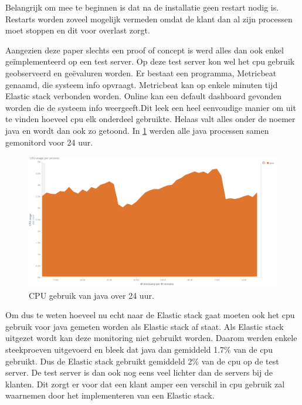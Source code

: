 Belangrijk om mee te beginnen is dat na de installatie geen restart nodig is. Restarts worden zoveel mogelijk vermeden omdat de klant dan al zijn processen moet stoppen en dit voor overlast zorgt.

Aangezien deze paper slechts een proof of concept is werd alles dan ook enkel geïmplementeerd op een test server. Op deze test server kon wel het cpu gebruik geobserveerd en geëvaluren worden. 
Er bestaat een programma, Metricbeat genaamd, die systeem info opvraagt. Metricbeat kan op enkele minuten tijd Elastic stack verbonden worden. Online kan een default dashboard gevonden worden die de systeem info weergeeft.Dit leek een heel eenvoudige manier om uit te vinden hoeveel cpu elk onderdeel gebruikte. Helaas valt alles onder de noemer java en wordt dan ook zo getoond.
In \ref{fig:java} werden alle java processen samen gemonitord voor 24 uur. 

\begin{figure}[h]
	\includegraphics[width=16cm]{img/java1}
	\caption{CPU gebruik van java over 24 uur.}
	\label{fig:java}
\end{figure}

Om dus te weten hoeveel nu echt naar de Elastic stack gaat moeten ook het cpu gebruik voor java gemeten worden als Elastic stack af staat.
Als Elastic stack uitgezet wordt kan deze monitoring niet gebruikt worden. 
Daarom werden enkele steekproeven uitgevoerd en bleek dat java dan gemiddeld 1.7\% van de cpu gebruikt. Dus de Elastic stack gebruikt gemiddeld 2\% van de cpu op de test server. 
De test server is dan ook nog eens veel lichter dan de servers bij de klanten.
Dit zorgt er voor dat een klant amper een verschil in cpu gebruik zal waarnemen door het implementeren van een Elastic stack.


